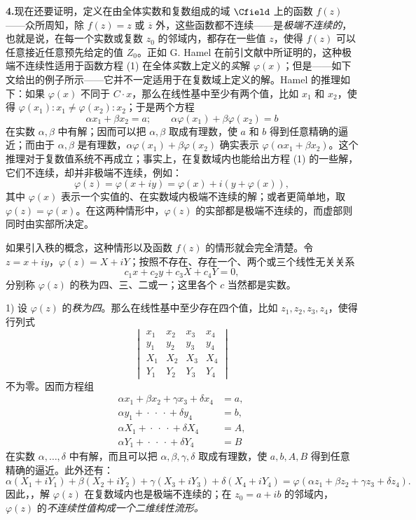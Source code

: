 \noindent\textbf{4.}\quad 现在还要证明，定义在由全体实数和复数组成的域 \(\Cfield\) 上的函数 \(f(z)\)——众所周知，除 \(f(z)=z\) 或 \(\overline z\) 外，这些函数都不连续——是\emph{极端不连续的}，也就是说，在每一个实数或复数 \(z_0\) 的邻域内，都存在一些值 \(z\)，使得 \(f(z)\) 可以任意接近任意预先给定的值 \(Z_0\)。正如 G. Hamel 在前引文献中所证明的，这种极端不连续性适用于函数方程 (1) 在全体\emph{实}数上定义的\emph{实}解 \(\varphi(x)\)；但是——如下文给出的例子所示——它并不一定适用于在复数域上定义的解。Hamel 的推理如下：如果 \(\varphi(x)\) 不同于 \(C\cdot x\)，那么在线性基中至少有两个值，比如 \(x_1\) 和 \(x_2\)，使得 \(\varphi(x_1):x_1\ne\varphi(x_2):x_2\)；于是两个方程
\[
\alpha x_1+\beta x_2=a;\qquad \alpha\varphi(x_1)+\beta\varphi(x_2)=b
\]
在实数 \(\alpha,\beta\) 中有解；因而可以把 \(\alpha,\beta\) 取成有理数，使 \(a\) 和 \(b\) 得到任意精确的逼近；而由于 \(\alpha,\beta\) 是有理数，\(\alpha\varphi(x_1)+\beta\varphi(x_2)\) 确实表示 \(\varphi(\alpha x_1+\beta x_2)\)。这个推理对于复数值系统不再成立；事实上，在复数域内也能给出方程 (1) 的一些解，它们不连续，却并非极端不连续，例如：
\[
\varphi(z)=\varphi(x+iy)=\varphi(x)+i(y+\varphi(x)),
\]
其中 \(\varphi(x)\) 表示一个实值的、在实数域内极端不连续的解；或者更简单地，取 \(\varphi(z)=\varphi(x)\)。在这两种情形中，\(\varphi(z)\) 的实部都是极端不连续的，而虚部则同时由实部所决定。

如果引入秩的概念，这种情形以及函数 \(f(z)\) 的情形就会完全清楚。令 \(z=x+iy\)，\(\varphi(z)=X+iY\)；按照不存在、存在一个、两个或三个线性无关关系
\[
c_1x+c_2y+c_3X+c_4Y=0,
\]
分别称 \(\varphi(z)\) 的秩为四、三、二或一；这里各个 \(c\) 当然都是实数。

1) 设 \(\varphi(z)\) 的\emph{秩为四}。那么在线性基中至少存在四个值，比如 \(z_1,z_2,z_3,z_4\)，使得行列式
\[
\begin{vmatrix}
x_1&x_2&x_3&x_4\\
y_1&y_2&y_3&y_4\\
X_1&X_2&X_3&X_4\\
Y_1&Y_2&Y_3&Y_4
\end{vmatrix}
\]
不为零。因而方程组
\[
\begin{aligned}
\alpha x_1+\beta x_2+\gamma x_3+\delta x_4&=a,\\
\alpha y_1+{}\cdot{}\ \cdot{}\ \cdot{}+\delta y_4&=b,\\
\alpha X_1+{}\cdot{}\ \cdot{}\ \cdot{}+\delta X_4&=A,\\
\alpha Y_1+{}\cdot{}\ \cdot{}\ \cdot{}+\delta Y_4&=B
\end{aligned}
\]
在实数 \(\alpha,\ldots,\delta\) 中有解，而且可以把 \(\alpha,\beta,\gamma,\delta\) 取成有理数，使 \(a,b,A,B\) 得到任意精确的逼近。此外还有：
\[
\alpha(X_1+iY_1)+\beta(X_2+iY_2)+\gamma(X_3+iY_3)+\delta(X_4+iY_4)
 =\varphi(\alpha z_1+\beta z_2+\gamma z_3+\delta z_4).
\]
因此，，解 \(\varphi(z)\) 在复数域内也是极端不连续的；在 \(z_0=a+ib\) 的邻域内，\(\varphi(z)\) 的\emph{不连续性值}\emph{构成一个二维线性流形。}

